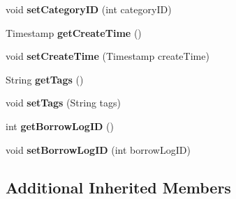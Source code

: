 \begin{DoxyCompactItemize}
\item 
\hypertarget{classcom_1_1github_1_1walterfan_1_1gtd_1_1model_1_1Book_a5917c9c56881d7cff1ee7279d68ef8e1}{void {\bfseries set\-Category\-I\-D} (int category\-I\-D)}\label{classcom_1_1github_1_1walterfan_1_1gtd_1_1model_1_1Book_a5917c9c56881d7cff1ee7279d68ef8e1}

\item 
\hypertarget{classcom_1_1github_1_1walterfan_1_1gtd_1_1model_1_1Book_ac04a62f9ed4c5a6f7af8bfd725716444}{Timestamp {\bfseries get\-Create\-Time} ()}\label{classcom_1_1github_1_1walterfan_1_1gtd_1_1model_1_1Book_ac04a62f9ed4c5a6f7af8bfd725716444}

\item 
\hypertarget{classcom_1_1github_1_1walterfan_1_1gtd_1_1model_1_1Book_a10a3dd297280764cf5c478fc3c279a80}{void {\bfseries set\-Create\-Time} (Timestamp create\-Time)}\label{classcom_1_1github_1_1walterfan_1_1gtd_1_1model_1_1Book_a10a3dd297280764cf5c478fc3c279a80}

\item 
\hypertarget{classcom_1_1github_1_1walterfan_1_1gtd_1_1model_1_1Book_a3e2ad7f1d3b7c4aa09f99f95b868c3e7}{String {\bfseries get\-Tags} ()}\label{classcom_1_1github_1_1walterfan_1_1gtd_1_1model_1_1Book_a3e2ad7f1d3b7c4aa09f99f95b868c3e7}

\item 
\hypertarget{classcom_1_1github_1_1walterfan_1_1gtd_1_1model_1_1Book_a9eeb2c631d09d9250cff4ec0b989ecb9}{void {\bfseries set\-Tags} (String tags)}\label{classcom_1_1github_1_1walterfan_1_1gtd_1_1model_1_1Book_a9eeb2c631d09d9250cff4ec0b989ecb9}

\item 
\hypertarget{classcom_1_1github_1_1walterfan_1_1gtd_1_1model_1_1Book_a6100304db75771c87a4b58b18b2b4ee4}{int {\bfseries get\-Borrow\-Log\-I\-D} ()}\label{classcom_1_1github_1_1walterfan_1_1gtd_1_1model_1_1Book_a6100304db75771c87a4b58b18b2b4ee4}

\item 
\hypertarget{classcom_1_1github_1_1walterfan_1_1gtd_1_1model_1_1Book_a2eaedd6b24e5b36590844c3b0676ad59}{void {\bfseries set\-Borrow\-Log\-I\-D} (int borrow\-Log\-I\-D)}\label{classcom_1_1github_1_1walterfan_1_1gtd_1_1model_1_1Book_a2eaedd6b24e5b36590844c3b0676ad59}

\end{DoxyCompactItemize}
\subsection*{Additional Inherited Members}


